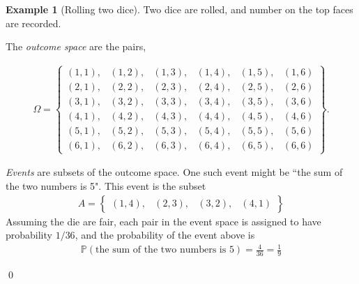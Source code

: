 \documentclass[11pt]{article}
\theoremstyle{definition}
\newtheorem{example}[theorem]{Example}
\renewcommand{\P}{\mathbb{P}}
\begin{document}
\begin{example}[Rolling two dice]

  Two dice are rolled, and number on the top faces are recorded.

  The \textit{outcome space} are the pairs,

\begin{align*}
  \Omega = \begin{Bmatrix}
    (1, 1), & (1, 2), & (1, 3), & (1, 4), & (1, 5), & (1, 6) \\
    (2, 1), & (2, 2), & (2, 3), & (2, 4), & (2, 5), & (2, 6) \\
    (3, 1), & (3, 2), & (3, 3), & (3, 4), & (3, 5), & (3, 6) \\
    (4, 1), & (4, 2), & (4, 3), & (4, 4), & (4, 5), & (4, 6) \\
    (5, 1), & (5, 2), & (5, 3), & (5, 4), & (5, 5), & (5, 6) \\
    (6, 1), & (6, 2), & (6, 3), & (6, 4), & (6, 5), & (6, 6)
  \end{Bmatrix}.
\end{align*}

  \textit{Events} are subsets of the outcome space. One such event
  might be ``the sum of the two numbers is 5". This event is the subset
  \begin{align*}
    A = \begin{Bmatrix} (1, 4), & (2, 3), & (3, 2), & (4, 1) \end{Bmatrix}
  \end{align*}
  Assuming the die are fair, each pair in the event space is assigned to have
  probability $1/36$, and the probability of the event above is
  \begin{align*}
   \P(\text{the sum of the two numbers is 5}) = \frac{4}{36} = \frac{1}{9}
  \end{align*}

\qed
\end{example}
\end{document}
